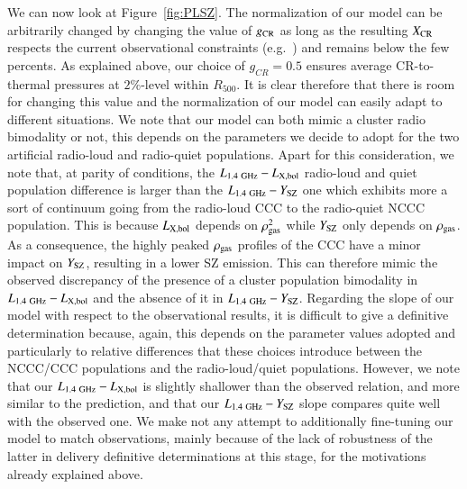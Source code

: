 \documentclass[traditabstract]{aa}
\newcommand{\rmn}{\mathrm}
\begin{document}
We can now look at Figure~\ref{fig:PLSZ}. The normalization of our model can be arbitrarily changed by changing the value of $g_{\rm{CR}}$ as long as the resulting $X_{\rm{CR}}$ respects the current observational constraints (e.g.~\citealp{2011arXiv1111.5544M}) and remains below the few percents. As explained above, our choice of $g_{CR}=0.5$ ensures average CR-to-thermal pressures at $2\%$-level within $R_{500}$. It is clear therefore that there is room for changing this value and the normalization of our model can easily adapt to different situations. We note that our model can both mimic a cluster radio bimodality or not, this depends on the parameters we decide to adopt for the two artificial radio-loud and radio-quiet populations. Apart for this consideration, we note that, at parity of conditions, the $L_{1.4~\rmn{GHz}}-L_{\rm{X,bol}}$ radio-loud and quiet population difference is larger than the $L_{1.4~\rmn{GHz}}-Y_{\rm{SZ}}$ one which exhibits more a sort of continuum going from the radio-loud CCC to the radio-quiet NCCC population. This is because $L_{\rm{X,bol}}$ depends on $\rho_{\rm{gas}}^2$ while $Y_{\rm{SZ}}$ only depends on $\rho_{\rm{gas}}$. As a consequence, the highly peaked $\rho_{\rm{gas}}$ profiles of the CCC have a minor impact on $Y_{\rm{SZ}}$, resulting in a lower SZ emission. This can therefore mimic the observed discrepancy of the presence of a cluster population bimodality  in $L_{1.4~\rmn{GHz}}-L_{\rm{X,bol}}$ and the absence of it in $L_{1.4~\rmn{GHz}}-Y_{\rm{SZ}}$. Regarding the slope of our model with respect to the observational results, it is difficult to give a definitive determination because, again, this depends on the parameter values adopted and particularly to relative differences that these choices introduce between the NCCC/CCC populations and the radio-loud/quiet populations. However, we note that our $L_{1.4~\rmn{GHz}}-L_{\rm{X,bol}}$ is slightly shallower than the observed relation, and more similar to the \cite{2009JCAP...09..024K} prediction, and that our $L_{1.4~\rmn{GHz}}-Y_{\rm{SZ}}$ slope compares quite well with the observed one. We make not any attempt to additionally fine-tuning our model to match observations, mainly because of the lack of robustness of the latter in delivery definitive determinations at this stage, for the motivations already explained above. 
\end{document}
